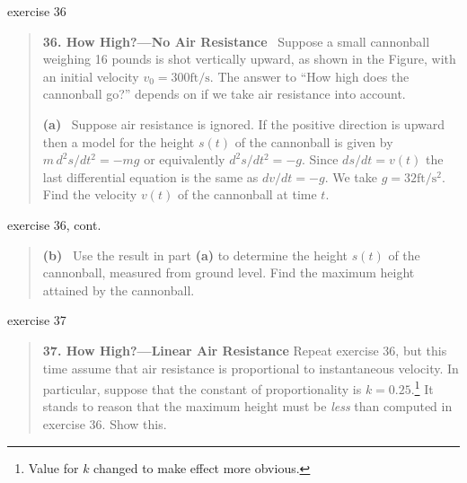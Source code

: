 \documentclass[colorlinks]{beamer}
\begin{document}
\begin{frame}{exercise 36}

\begin{minipage}[t]{0.8\textwidth}
\small
\begin{quotation}
\noindent \textbf{36. How High?---No Air Resistance} \, Suppose a small cannonball weighing 16 pounds is shot vertically upward, as shown in the Figure, with an initial velocity $v_0 = 300 \text{ft}/\text{s}$.  The answer to ``How high does the cannonball go?'' depends on if we take air resistance into account.

\medskip
\noindent \textbf{(a)} \, Suppose air resistance is ignored.  If the positive direction is upward then a model for the height $s(t)$ of the cannonball is given by $m\, d^2s/dt^2 = - mg$ or equivalently $d^2s/dt^2 = - g$.  Since $ds/dt = v(t)$ the last differential equation is the same as $dv/dt = -g$.  We take $g=32 \text{ft}/\text{s}^2$.  Find the velocity $v(t)$ of the cannonball at time $t$.
\end{quotation}
\end{minipage}
\begin{minipage}[t]{0.2\textwidth}
\vspace{0mm}

\hfill %
\end{minipage}

\vspace{20mm}
\end{frame}


\begin{frame}{exercise 36, cont.}

\small
\begin{quotation}
\noindent \textbf{(b)} \, Use the result in part \textbf{(a)} to determine the height $s(t)$ of the cannonball, measured from ground level.  Find the maximum height attained by the cannonball.
\end{quotation}

\vspace{60mm}
\end{frame}


\begin{frame}{exercise 37}

\begin{quotation}
\noindent \textbf{37.  How High?---Linear Air Resistance}  Repeat exercise 36, but this time assume that air resistance is proportional to instantaneous velocity.  In particular, suppose that the constant of proportionality is $k=0.25$.\footnote{Value for $k$ changed to make effect more obvious.}  It stands to reason that the maximum height must be \emph{less} than computed in exercise 36.  Show this.
\end{quotation}

\vspace{40mm}
\end{frame}
\end{document}
